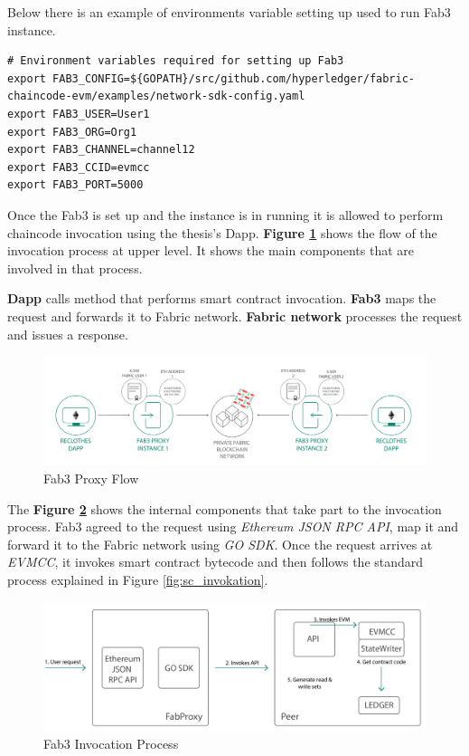 Below there is an example of environments variable setting up used to run Fab3 instance.

\begin{lstlisting}
# Environment variables required for setting up Fab3
export FAB3_CONFIG=${GOPATH}/src/github.com/hyperledger/fabric-chaincode-evm/examples/network-sdk-config.yaml 
export FAB3_USER=User1 
export FAB3_ORG=Org1
export FAB3_CHANNEL=channel12 
export FAB3_CCID=evmcc
export FAB3_PORT=5000
\end{lstlisting}

Once the Fab3 is set up and the instance is in running it is allowed to perform chaincode invocation using the 
thesis's Dapp. \textbf{Figure \ref{fig:fab3_flow}} shows the flow of the invocation process at upper level. 
It shows the main components that are involved in that process. 

\begin{outline}[enumerate]
    \1 \textbf{Dapp} calls method that performs smart contract invocation.
    \1 \textbf{Fab3} maps the request and forwards it to Fabric network.
    \1 \textbf{Fabric network} processes the request and issues a response.
\end{outline}

\begin{figure}[h!]
    \centering
    \includegraphics[totalheight=5cm]{img/fab3_flow.png}
    \caption{Fab3 Proxy Flow}
    \label{fig:fab3_flow}
\end{figure}

The \textbf{Figure \ref{fig:fab3_invokation}} shows the internal components that take part to the invocation process. 
Fab3 agreed to the request using \textit{Ethereum JSON RPC API}, map it and forward it to the Fabric network using 
\textit{GO SDK}. Once the request arrives at \textit{EVMCC}, it invokes smart contract bytecode and then follows the 
standard process explained in Figure \ref{fig:sc_invokation}.

\begin{figure}[h!]
    \centering
    \includegraphics[totalheight=5cm]{img/fab3_invokation.png}
    \caption{Fab3 Invocation Process}
    \label{fig:fab3_invokation}
\end{figure}


